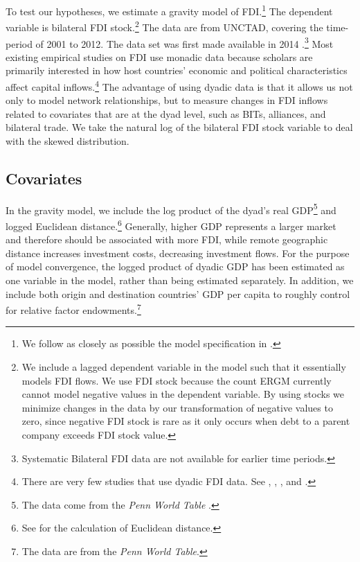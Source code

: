 \documentclass[reqno,onecolumn,letterpaper,12pt]{article}
\begin{document}
To test our hypotheses, we estimate a gravity model of FDI.\footnote{We follow as closely as possible the model specification in \citet{Li_Vashchilko:2010}.} The dependent variable is bilateral FDI stock.\footnote{We include a lagged dependent variable in the model such that it essentially models FDI flows. We use FDI stock because the count ERGM currently cannot model negative values in the dependent variable. By using stocks we minimize changes in the data by our transformation of negative values to zero, since negative FDI stock is rare as it only occurs when debt to a parent company exceeds FDI stock value.} The data are from UNCTAD, covering the time-period of 2001 to 2012. The data set was first made available in 2014 \citep{UNCTAD:2014}.\footnote{Systematic Bilateral FDI data are not available for earlier time periods.} Most existing empirical studies on FDI use monadic data because scholars are primarily interested in how host countries' economic and political characteristics affect capital inflows.\footnote{There are very few studies that use dyadic FDI data. See \citet{Frenkel_et_al:2004}, \citet{Leblang:2010}, \citet{Li_Vashchilko:2010}, and \citet{Razin_et_al:2005}. } The advantage of using dyadic data is that it allows us not only to model network relationships, but to measure changes in FDI inflows related to covariates that are at the dyad level, such as BITs, alliances, and bilateral trade. We take the natural log of the bilateral FDI stock variable to deal with the skewed distribution.


\subsection{Covariates}

In the gravity model, we include the log product of the dyad's real GDP\footnote{The data come from the \textit{Penn World Table}  \citep{feenstra2015next}.} and logged Euclidean distance.\footnote{See \citet{mayer2011notes} for the calculation of Euclidean distance.} Generally, higher GDP represents a larger market and therefore should be associated with more FDI, while remote geographic distance increases investment costs, decreasing investment flows. For the purpose of model convergence, the logged product of dyadic GDP has been estimated as one variable in the model, rather than being estimated separately. In addition, we include both origin and destination countries' GDP per capita to roughly control for relative factor endowments.\footnote{The data are from the \textit{Penn World Table}.}
\end{document}
